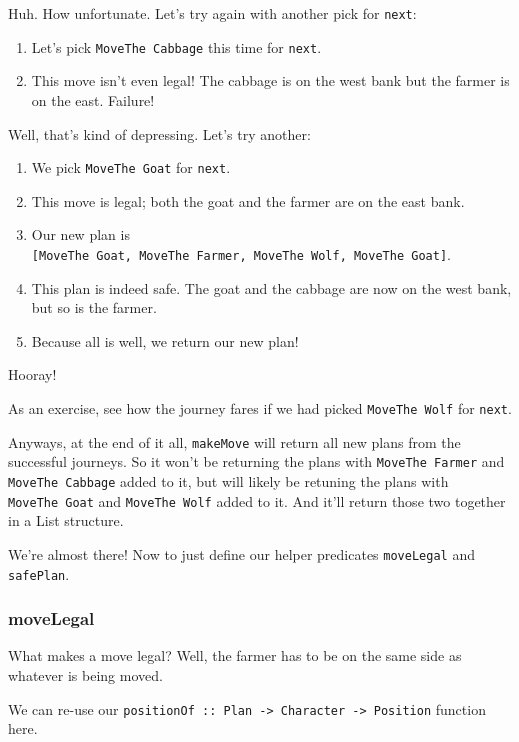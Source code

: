 \documentclass[]{article}
\begin{document}
Huh. How unfortunate. Let's try again with another pick for \texttt{next}:

\begin{enumerate}
\tightlist
\item
  Let's pick \texttt{MoveThe\ Cabbage} this time for \texttt{next}.
\item
  This move isn't even legal! The cabbage is on the west bank but the farmer is
  on the east. Failure!
\end{enumerate}

Well, that's kind of depressing. Let's try another:

\begin{enumerate}
\tightlist
\item
  We pick \texttt{MoveThe\ Goat} for \texttt{next}.
\item
  This move is legal; both the goat and the farmer are on the east bank.
\item
  Our new plan is
  \texttt{{[}MoveThe\ Goat,\ MoveThe\ Farmer,\ MoveThe\ Wolf,\ MoveThe\ Goat{]}}.
\item
  This plan is indeed safe. The goat and the cabbage are now on the west bank,
  but so is the farmer.
\item
  Because all is well, we return our new plan!
\end{enumerate}

Hooray!

As an exercise, see how the journey fares if we had picked
\texttt{MoveThe\ Wolf} for \texttt{next}.

Anyways, at the end of it all, \texttt{makeMove} will return all new plans from
the successful journeys. So it won't be returning the plans with
\texttt{MoveThe\ Farmer} and \texttt{MoveThe\ Cabbage} added to it, but will
likely be retuning the plans with \texttt{MoveThe\ Goat} and
\texttt{MoveThe\ Wolf} added to it. And it'll return those two together in a
List structure.

We're almost there! Now to just define our helper predicates \texttt{moveLegal}
and \texttt{safePlan}.

\subsubsection{moveLegal}

What makes a move legal? Well, the farmer has to be on the same side as whatever
is being moved.

We can re-use our
\texttt{positionOf\ ::\ Plan\ -\textgreater{}\ Character\ -\textgreater{}\ Position}
function here.
\end{document}
